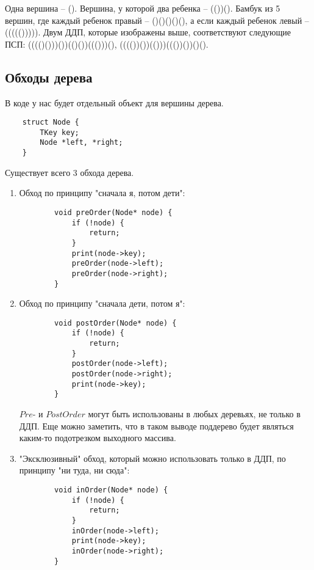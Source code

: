 \begin{example}
    Одна вершина -- (). Вершина, у которой два ребенка -- (())(). Бамбук из 5 вершин, где каждый ребенок правый -- ()()()()(), а если каждый ребенок левый -- ((((())))).
    Двум ДДП, которые изображены выше, соответствуют следующие ПСП: (((()()))())(()())((()))(), (((())())(()))((())())()().
\end{example}



\subsection{Обходы дерева}



В коде у нас будет отдельный объект для вершины дерева.
\begin{lstlisting}
    struct Node {
        TKey key;
        Node *left, *right;
    }
\end{lstlisting}

Существует всего 3 обхода дерева. 

\begin{enumerate}
    \item Обход по принципу "сначала я, потом дети":
    \begin{lstlisting}
        void preOrder(Node* node) {
            if (!node) {
                return;
            }
            print(node->key);
            preOrder(node->left);
            preOrder(node->right);
        }
    \end{lstlisting}
    \item Обход по принципу "сначала дети, потом я":
    \begin{lstlisting}
        void postOrder(Node* node) {
            if (!node) {
                return;
            }
            postOrder(node->left);
            postOrder(node->right);
            print(node->key);
        }
    \end{lstlisting}
    $Pre$- и $PostOrder$ могут быть использованы в любых деревьях, не только в ДДП. Еще можно заметить, что в таком выводе поддерево будет являться каким-то подотрезком выходного массива.
    \item "Эксклюзивный" обход, который можно использовать только в ДДП, по принципу "ни туда, ни сюда":
    \begin{lstlisting}
        void inOrder(Node* node) {
            if (!node) {
                return;
            }
            inOrder(node->left);
            print(node->key);
            inOrder(node->right);
        }
    \end{lstlisting}
\end{enumerate}


